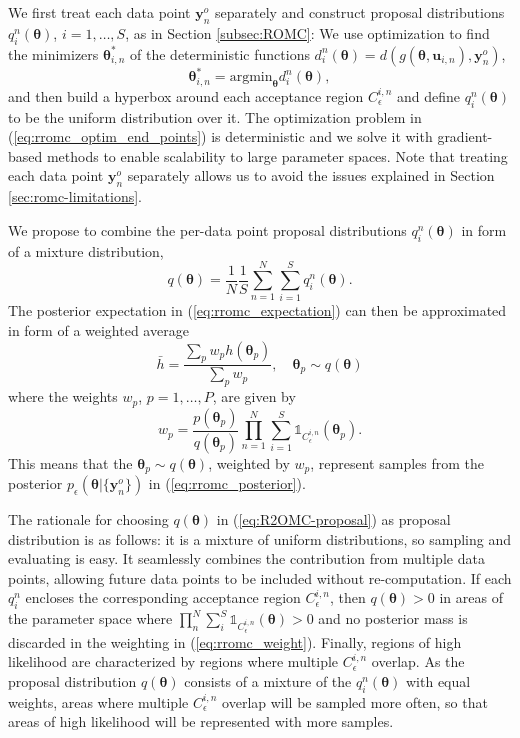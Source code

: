 \documentclass[twoside]{article}
\newcommand{\thb}{\boldsymbol{\theta}}
\newcommand{\ub}{\mathbf{u}}
\newcommand{\data}{\mathbf{y}^o}
\begin{document}
We first treat each data point $\data_n$ separately and construct proposal distributions $q_i^n(\thb)$, $i=1, \ldots, S$, as in Section \ref{subsec:ROMC}: We use optimization to find the minimizers $\thb_{i,n}^*$ of the deterministic functions $d_i^n(\thb) = d(g(\thb, \ub_{i,n}), \data_n)$,       
\begin{equation}
 \thb_{i,n}^* = \text{argmin}_{\thb} d_i^n(\thb),
 \label{eq:rromc_optim_end_points}
\end{equation}
and then build a hyperbox around each acceptance region $C_{\epsilon}^{i,n}$ and define $q_i^n(\thb)$ to be the uniform distribution over it. The optimization problem in (\ref{eq:rromc_optim_end_points}) is deterministic and we solve it with gradient-based methods to enable scalability to large parameter spaces. Note that treating each data point $\data_n$ separately allows us to avoid the issues explained in Section \ref{sec:romc-limitations}.

We propose to combine the per-data point proposal distributions $q_i^n(\thb)$ in form of a mixture distribution,
\begin{equation}
    q(\thb) = \frac{1}{N} \frac{1}{S} \sum_{n=1}^N \sum_{i=1}^S q_i^n (\thb).
    \label{eq:R2OMC-proposal}
\end{equation}
The posterior expectation in (\ref{eq:rromc_expectation}) can then be approximated in form of a weighted average 
\begin{equation}
  \label{eq:rromc_sample_expectation}
  \bar{h} = \frac{\sum_p w_p h(\thb_p)}{\sum_p w_p}, \quad \thb_p \sim q(\thb)
\end{equation}
where the weights $w_p$, $p=1, \ldots, P$, are given by
\begin{equation}
  \label{eq:rromc_weight}
w_p= \frac{p(\thb_p)}{q(\thb_p)} \prod_{n=1}^N \sum_{i=1}^S \mathbb{1}_{C_{\epsilon}^{i,n}}(\thb_p). 
\end{equation}
This means that the $\thb_p \sim q(\thb)$, weighted by $w_p$, represent samples from the posterior $p_{\epsilon}(\thb | \{\data_n\})$ in (\ref{eq:rromc_posterior}).

The rationale for choosing $q(\thb)$ in (\ref{eq:R2OMC-proposal}) as proposal distribution is as follows: it is a mixture of uniform distributions, so sampling and evaluating is easy. It seamlessly combines the contribution from multiple data points, allowing future data points to be included without re-computation. If each $q_i^n$ encloses the corresponding acceptance region $C_{\epsilon}^{i,n}$, then $q(\thb) > 0$ in areas of the parameter space where $\prod_n^N \sum_i^S \mathbb{1}_{C_{\epsilon}^{i,n}}(\thb) > 0$ and no posterior mass is discarded in the weighting in (\ref{eq:rromc_weight}). Finally, regions of high likelihood are characterized by regions where multiple $C_{\epsilon}^{i,n}$ overlap. As the proposal distribution $q(\thb)$ consists of a mixture of the $q_i^n(\thb)$ with equal weights, areas where multiple $C_{\epsilon}^{i,n}$ overlap will be sampled more often, so that areas of high likelihood will be represented with more samples.
\end{document}
